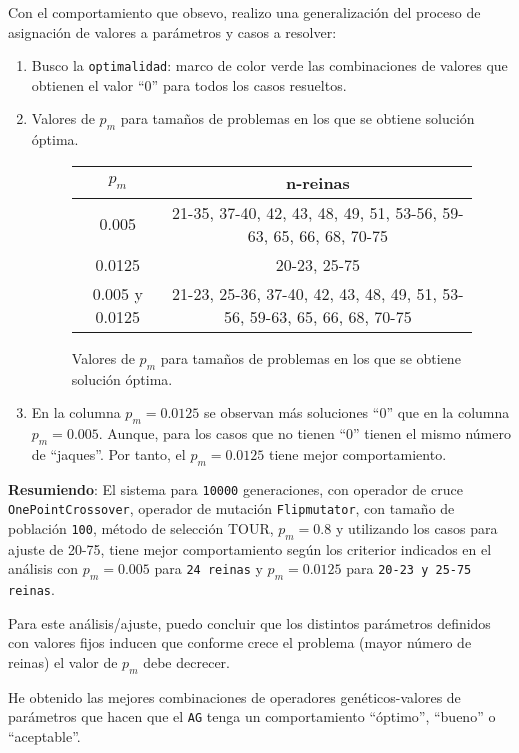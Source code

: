 \par Con el comportamiento que obsevo, realizo una generalización del proceso de asignación de valores
a parámetros y casos a resolver:
\begin{enumerate}
	\item Busco la \texttt{optimalidad}: marco de color \colorbox{green!25}{verde} las combinaciones de valores que obtienen el valor
	 ``0'' para todos los casos resueltos.
	\item Valores de $p_m$ para tamaños de problemas en los que se obtiene solución óptima.
	\begin{figure}[H]
		\centering
			\begin{tabular}{|c|c|}
				\hline
				\rowcolor{blue!25} \textbf{$p_m$} &\textbf{n-reinas} \\ \hline
				0.005& 21-35, 37-40, 42, 43, 48, 49, 51, 53-56, 59-63, 65, 66, 68, 70-75\\ \hline
				0.0125& 20-23, 25-75 \\ \hline
				0.005 y 0.0125& 21-23, 25-36, 37-40, 42, 43, 48, 49, 51, 53-56, 59-63, 65, 66, 68, 70-75\\ \hline
				\end{tabular}
		\caption{Valores de $p_m$ para tamaños de problemas en los que se obtiene solución óptima.}
		\label{fig:valores}
	\end{figure}
	\newpage	
	\item En la columna $p_m = 0.0125$ se observan más soluciones ``0'' que en la columna $p_m = 0.005$. Aunque,
	para los casos que no tienen ``0'' tienen el mismo número de ``jaques''. Por tanto, el $p_m = 0.0125$ tiene mejor 
	comportamiento.
\end{enumerate}

\par \textbf{Resumiendo}: El sistema para \texttt{10000} generaciones, con operador de cruce \\
\texttt{OnePointCrossover}, operador de mutación
\texttt{Flipmutator}, con tamaño de población \texttt{100}, método de selección TOUR, $p_m = 0.8$
y utilizando los casos para ajuste de 20-75, tiene mejor comportamiento según los criterior indicados en el
análisis con  \texttt{$p_m = 0.005$} para \texttt{24 reinas} y \texttt{$p_m = 0.0125$} para \texttt{20-23 y 25-75 reinas}. 
\par Para este análisis/ajuste, puedo concluir que los distintos parámetros definidos con valores fijos
inducen que conforme crece el problema (mayor número de reinas) el valor de \texttt{$p_m$} debe decrecer.
\par He obtenido las mejores combinaciones de operadores genéticos-valores de parámetros que hacen que el \texttt{AG} tenga
un comportamiento ``óptimo'', ``bueno'' o ``aceptable''.